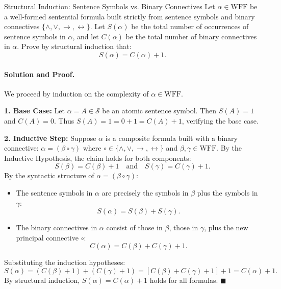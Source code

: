 \begin{workedexample}{Structural Induction: Sentence Symbols vs. Binary Connectives}
Let $\alpha \in \mathrm{WFF}$ be a well-formed sentential formula built strictly from sentence symbols and binary connectives $\{\land, \lor, \to, \leftrightarrow\}$.
Let $S(\alpha)$ be the total number of occurrences of sentence symbols in $\alpha$, and let $C(\alpha)$ be the total number of binary connectives in $\alpha$.
Prove by structural induction that:
\[
S(\alpha) = C(\alpha) + 1.
\]

\paragraph{Solution and Proof.}
We proceed by induction on the complexity of $\alpha \in \mathrm{WFF}$.

\textbf{1. Base Case:}
Let $\alpha = A \in \mathcal{S}$ be an atomic sentence symbol.
Then $S(A) = 1$ and $C(A) = 0$.
Thus $S(A) = 1 = 0 + 1 = C(A) + 1$, verifying the base case.

\textbf{2. Inductive Step:}
Suppose $\alpha$ is a composite formula built with a binary connective: $\alpha = (\beta \circ \gamma)$ where $\circ \in \{\land, \lor, \to, \leftrightarrow\}$ and $\beta, \gamma \in \mathrm{WFF}$.
By the Inductive Hypothesis, the claim holds for both components:
\[
S(\beta) = C(\beta) + 1 \quad \text{and} \quad S(\gamma) = C(\gamma) + 1.
\]
By the syntactic structure of $\alpha = (\beta \circ \gamma)$:
\begin{itemize}[leftmargin=1.4em,itemsep=2pt]
  \item The sentence symbols in $\alpha$ are precisely the symbols in $\beta$ plus the symbols in $\gamma$:
  \[
  S(\alpha) = S(\beta) + S(\gamma).
  \]
  \item The binary connectives in $\alpha$ consist of those in $\beta$, those in $\gamma$, plus the new principal connective $\circ$:
  \[
  C(\alpha) = C(\beta) + C(\gamma) + 1.
  \]
\end{itemize}
Substituting the induction hypotheses:
\[
S(\alpha) = (C(\beta) + 1) + (C(\gamma) + 1) = [C(\beta) + C(\gamma) + 1] + 1 = C(\alpha) + 1.
\]
By structural induction, $S(\alpha) = C(\alpha) + 1$ holds for all formulas. $\blacksquare$
\end{workedexample}

